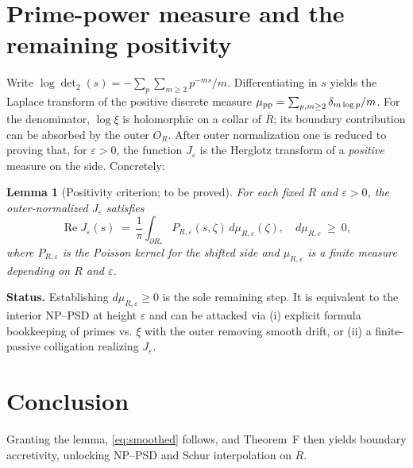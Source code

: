 \documentclass[11pt]{article}
\newtheorem{lemma}{Lemma}
\theoremstyle{remark}
\newcommand{\ReS}{\operatorname{Re}}
\begin{document}
\section*{Prime-power measure and the remaining positivity}
Write $\log\det_2(s)= -\sum_{p}\sum_{m\ge2} p^{-ms}/m$. Differentiating in $s$ yields the Laplace transform of the positive discrete measure $\mu_{\rm pp}=\sum_{p,m\ge2} \delta_{m\log p}/m$. For the denominator, $\log\xi$ is holomorphic on a collar of $\overline R$; its boundary contribution can be absorbed by the outer $O_R$. After outer normalization one is reduced to proving that, for $\varepsilon>0$, the function $J_\varepsilon$ is the Herglotz transform of a \emph{positive} measure on the side. Concretely:

\begin{lemma}[Positivity criterion; to be proved]
For each fixed $R$ and $\varepsilon>0$, the outer-normalized $J_\varepsilon$ satisfies
\[
\ReS J_\varepsilon(s)\ =\ \frac{1}{\pi}\int_{\partial R_*} P_{R,\varepsilon}(s,\zeta)\, d\mu_{R,\varepsilon}(\zeta),\quad d\mu_{R,\varepsilon}\ \ge\ 0,
\]
where $P_{R,\varepsilon}$ is the Poisson kernel for the shifted side and $\mu_{R,\varepsilon}$ is a finite measure depending on $R$ and $\varepsilon$.
\end{lemma}

\noindent\textbf{Status.} Establishing $d\mu_{R,\varepsilon}\ge0$ is the sole remaining step. It is equivalent to the interior NP--PSD at height $\varepsilon$ and can be attacked via (i) explicit formula bookkeeping of primes vs. $\xi$ with the outer removing smooth drift, or (ii) a finite-passive colligation realizing $J_\varepsilon$.

\section*{Conclusion}
Granting the lemma, \eqref{eq:smoothed} follows, and Theorem~F then yields boundary accretivity, unlocking NP--PSD and Schur interpolation on $R$.
\end{document}

